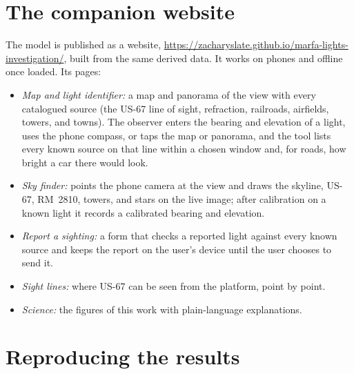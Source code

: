 \documentclass[11pt]{article}
\newif\ifanonymous
\newcommand{\website}{\ifanonymous[website withheld for review; a copy is included in this Supporting Information as \texttt{website.zip}]\else\url{https://zacharyslate.github.io/marfa-lights-investigation/}\fi}
\begin{document}
\section{The companion website}\label{s:website}

The model is published as a website, \website, built from the same derived data. It works on phones and offline once loaded. Its pages:
\begin{itemize}\itemsep0pt
\item \textit{Map and light identifier:} a map and panorama of the view with every catalogued source (the US-67 line of sight, refraction, railroads, airfields, towers, and towns). The observer enters the bearing and elevation of a light, uses the phone compass, or taps the map or panorama, and the tool lists every known source on that line within a chosen window and, for roads, how bright a car there would look.
\item \textit{Sky finder:} points the phone camera at the view and draws the skyline, US-67, RM~2810, towers, and stars on the live image; after calibration on a known light it records a calibrated bearing and elevation.
\item \textit{Report a sighting:} a form that checks a reported light against every known source and keeps the report on the user's device until the user chooses to send it.
\item \textit{Sight lines:} where US-67 can be seen from the platform, point by point.
\item \textit{Science:} the figures of this work with plain-language explanations.
\end{itemize}

\ifanonymous A copy of the website is included as \texttt{website.zip}; open \texttt{index.html} in a browser.\fi

\section{Reproducing the results}\label{s:reproduce}
\end{document}
